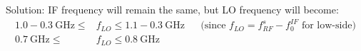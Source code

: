 \begin{homeworkProblem}
\begin{enumerate}[1.]
\begin{callout}{Solution:}
            IF frequency will remain the same, but LO frequency will become:
            \begin{align*}
                1.0-0.3\mathrm{~GHz} \leq &f_{LO}\leq 1.1-0.3\mathrm{~GHz} &&\text{(since $f_{LO}=f_{RF}^{s}-f_{0}^{IF}$ for low-side)} \\
                0.7\mathrm{~GHz} \leq &f_{LO}\leq 0.8\mathrm{~GHz}
            \end{align*}

        \end{callout}
\end{enumerate}
\end{homeworkProblem}
